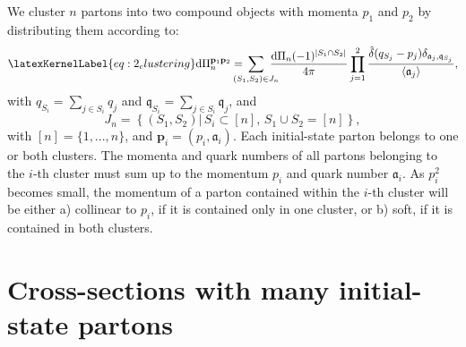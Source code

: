 \documentclass[%
 reprint,
 amsmath,amssymb,
 superscriptaddress,
 aps,
 preprintnumbers,
prl,
floatfix,
]{revtex4-2}
\let\label\latexKernelLabel
\begin{document}
We cluster $n$ partons into two compound objects with momenta $p_1$ and $p_2$ by distributing them according to:
\begin{equation}
\label{eq:2_clustering}
\mathrm{d}\Pi_n^{\mathbf{p}_1\mathbf{p}_2}=\hspace{-0.4cm}\sum_{(S_1,S_2)\in J_n}\hspace{-0.35cm}\frac{\mathrm{d}\Pi_n (-1)^{|S_1\cap S_2|}}{4\pi} \prod_{j=1}^2 \frac{\hat{\delta}(q_{S_j}-p_j)\delta_{\mathfrak{a}_j,\mathfrak{q}_{S_j}}}{\langle\mathfrak{a}_j\rangle},
\end{equation}
with $q_{S_i}=\sum_{j\in S_i} q_j$ and $\mathfrak{q}_{S_i}=\sum_{j\in S_i} \mathfrak{q}_j$, and
\begin{equation}
J_n=\left\{(S_1,S_2)\big|\, S_i\subset[n], \, S_1\cup S_2=[n]\right\},
\end{equation}
with $[n]=\{1,...,n\}$, and $\mathbf{p}_i=(p_i,\mathfrak{a}_i)$.
Each initial-state parton belongs to one or both clusters.
The momenta and quark numbers of all partons belonging to the $i$-th cluster must sum up to the momentum $p_i$ and quark number $\mathfrak{a}_i$.
As $p_i^2$ becomes small, the momentum of a parton contained within the $i$-th cluster will be either a) collinear to $p_i$, if it is contained only in one cluster, or  b) soft, if it is contained in both clusters.

\section{Cross-sections with many initial-state partons}
\label{sec:formalism}
\end{document}
